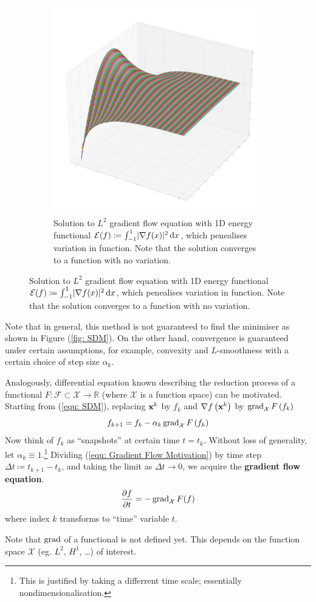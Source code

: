 \documentclass[../dissertation.tex]{subfiles}
\begin{document}
\begin{figure}[tbp]
\begin{subfigure}[b]{0.4\textwidth}
        \includegraphics[width=\textwidth]{sections/gradientFlowImgs/gf}
        \caption{Solution to $L^2$ gradient flow equation with 1D energy functional $\mathcal{E} (f) \coloneqq \int_{-1}^1 \lvert\nabla f(x)\lvert^2 \, \text{d} x$, which penealises variation in function. Note that the solution converges to a function with no variation.}
        \label{fig: GF}
    \end{subfigure}
\end{figure}
Note that in general, this method is not guaranteed to find the minimiser as shown in Figure (\ref{fig: SDM}).
On the other hand, convergence is guaranteed under certain assumptions, for example, convexity and $L$-smoothness with a certain choice of step size $\alpha_k$.

Analogously, differential equation known describing the reduction process of a functional $F:\mathcal{F} \subset \mathcal{X} \rightarrow \mathbb{R}$ (where $\mathcal{X}$ is a function space) can be motivated.
Starting from (\ref{equ: SDM}), replacing $\mathbf{x}^{k}$ by $f_k$ and $\nabla f\left( \mathbf{x}^k \right)$ by $\operatorname{grad}_{\mathcal{X}} F\left( f_k \right)$
\begin{equation}
    f_{k+1} = f_k - \alpha_k \operatorname{grad}_{\mathcal{X}} F \left( f_k \right)
    \label{equ: Gradient Flow Motivation}
\end{equation}
Now think of $f_k$ as ``snapshots'' at certain time $t = t_k$.
Without loss of generality, let $\alpha_k \equiv 1$.\footnote{
This is justified by taking a differrent time scale; essentially nondimensionalisation.}
Dividing (\ref{equ: Gradient Flow Motivation}) by time step $\Delta t \coloneqq t_{k+1} - t_k$,
and taking the limit as $\Delta t \rightarrow 0$,
we acquire the \textbf{gradient flow equation}\cite{YSC2021}.
\begin{equation}
    \frac{\partial f}{\partial t} = - \operatorname{grad}_{\mathcal{X}} F (f)
\end{equation}
where index $k$ transforms to ``time'' variable $t$.

Note that $\operatorname{grad}$ of a functional is not defined yet. This depends on the function space $\mathcal{X}$ (eg. $L^2$, $H^1$, \ldots) of interest.
\end{document}
